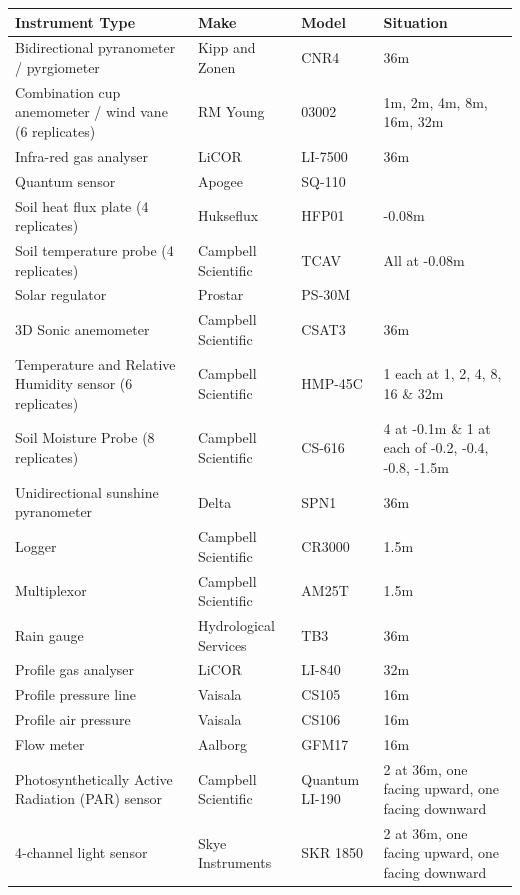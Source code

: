 \documentclass[11pt,a4paper]{article}
\begin{document}
\begin{longtable}{p{4.5cm}p{3.5cm}p{3.5cm}p{3.5cm}}
\toprule
\textbf{Instrument Type} & \textbf{Make} & \textbf{Model} & \textbf{Situation} \\
\midrule
\endhead
\bottomrule
\endfoot
Bidirectional  pyranometer / pyrgiometer & Kipp  and Zonen & CNR4 & 36m \\
Combination  cup anemometer / wind vane                (6 replicates) & RM  Young & 03002 & 1m,  2m, 4m, 8m, 16m, 32m \\
Infra-red  gas analyser & LiCOR & LI-7500 & 36m \\
Quantum  sensor & Apogee & SQ-110 &  \\
Soil  heat flux plate                (4 replicates) & Hukseflux & HFP01 & -0.08m \\
Soil  temperature probe                (4 replicates) & Campbell  Scientific & TCAV & All  at -0.08m \\
Solar  regulator & Prostar & PS-30M &  \\
3D Sonic  anemometer & Campbell  Scientific & CSAT3 & 36m \\
Temperature  and Relative Humidity sensor                (6 replicates) & Campbell  Scientific & HMP-45C & 1  each at 1, 2, 4, 8, 16 \& 32m \\
Soil  Moisture Probe                (8 replicates) & Campbell  Scientific & CS-616 & 4  at -0.1m                 \& 1 at each of -0.2, -0.4, -0.8, -1.5m \\
Unidirectional  sunshine pyranometer & Delta & SPN1 & 36m \\
Logger & Campbell  Scientific & CR3000 & 1.5m \\
Multiplexor & Campbell  Scientific & AM25T & 1.5m \\
Rain  gauge & Hydrological Services & TB3 & 36m \\
Profile gas analyser & LiCOR & LI-840 & 32m \\
Profile  pressure line & Vaisala & CS105 & 16m \\
Profile  air pressure & Vaisala & CS106 & 16m \\
Flow  meter & Aalborg & GFM17 & 16m \\
Photosynthetically  Active Radiation (PAR) sensor & Campbell  Scientific & Quantum  LI-190 & 2  at 36m, one facing upward, one facing downward \\
4-channel light sensor & Skye  Instruments & SKR  1850 & 2  at 36m, one facing upward, one facing downward \\
\end{longtable}
\end{document}
